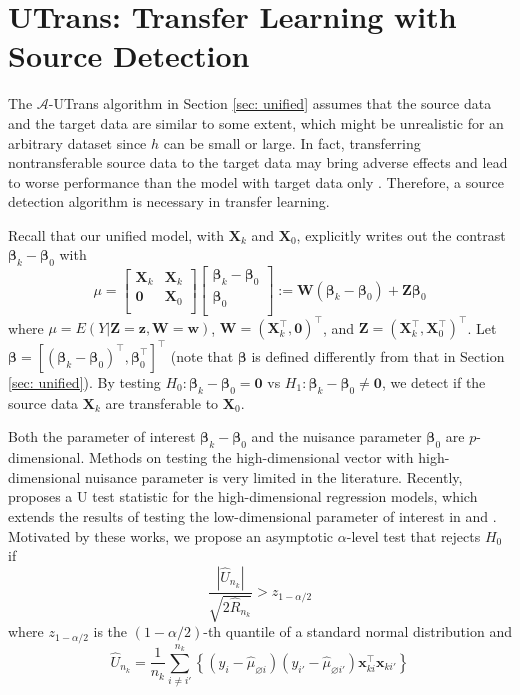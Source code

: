 \documentclass[twoside,12pt]{article}
\newcommand{\mb}[1]{\boldsymbol{\mathbf{#1}}}
\begin{document}
\section{UTrans: Transfer Learning with Source Detection}
\label{sec: detect}

The $\mathcal A$-UTrans algorithm in Section \ref{sec: unified} assumes that the source data and the target data are similar to some extent, which might be unrealistic for an arbitrary dataset since $h$ can be small or large.
In fact, transferring nontransferable source data to the target data may bring adverse effects and lead to worse performance than the model with target data only \citep{pan2009survey, tian2022transfer}.
Therefore, a source detection algorithm is necessary in transfer learning.

Recall that our unified model, with $\mb X_k$ and $\mb X_0$, explicitly writes out the contrast $\mb\beta_k-\mb\beta_0$ with 
\begin{equation*}
\mu=\begin{bmatrix}
		\mb X_k &\mb X_k\\
		\mb 0&\mb X_0\\
	\end{bmatrix} \begin{bmatrix}
	\mb\beta_k-\mb\beta_0 \\
	\mb\beta_0\\
\end{bmatrix}:=\mb W (\mb\beta_k-\mb\beta_0)+\mb Z \mb\beta_0
\end{equation*}
where $\mu=E(Y|\mb Z=\mb z, \mb W=\mb w)$, $\mb W=(\mb X_k^\top, \mb 0)^\top$, and $\mb Z=(\mb X_k^\top, \mb X_0^\top)^\top$.
Let $\mb\beta=[(\mb\beta_k-\mb\beta_0)^\top, \mb\beta_0^\top]^\top$ (note that $\mb\beta$ is defined differently from that in Section \ref{sec: unified}).
By testing $H_0: \mb\beta_k-\mb\beta_0=\mb 0$ vs $H_1: \mb\beta_k-\mb\beta_0\neq\mb 0$, we detect if the source data $\mb X_k$ are transferable to $\mb X_0$.

Both the parameter of interest $\mb\beta_k-\mb\beta_0$ and the nuisance parameter $\mb\beta_0$ are $p$-dimensional.
Methods on testing the high-dimensional vector with high-dimensional nuisance parameter is very limited in the literature. Recently, \citet{chen2022testing} proposes a U test statistic for the high-dimensional regression models, which extends the results of testing the low-dimensional parameter of interest in \citet{goeman2011testing} and \citet{guo2016tests}.
Motivated by these works, we propose an asymptotic $\alpha$-level test that rejects $H_0$ if 
$$\frac{|\hat{U}_{n_k}|}{\sqrt{2\hat R_{n_k}}}>z_{1-\alpha/2}$$
where $z_{1-\alpha/2}$ is the $(1-\alpha/2)$-th quantile of a standard normal distribution and
$$
	\hat{U}_{n_k}=\frac{1}{n_k} \sum_{i \neq i'}^{n_k}\left\{\left(y_i-\hat{\mu}_{\varnothing i}\right)\left(y_{i'}-\hat{\mu}_{\varnothing i'}\right) \mb x_{ki}^\top \mb x_{ki'}\right\} 
$$
\end{document}
